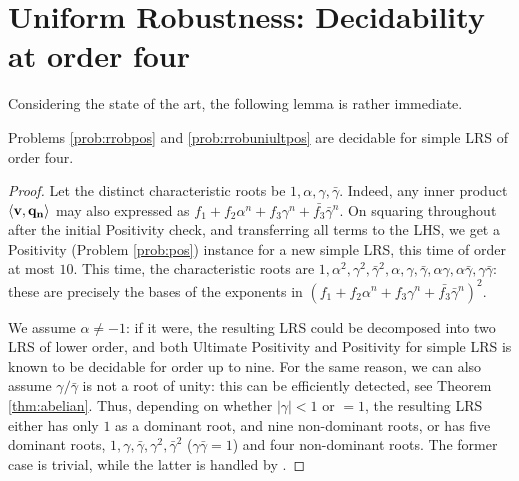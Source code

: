 \section{Uniform Robustness: Decidability at order four}
\label{section:decidability}

  \label{thm:abelian}

 Considering the state of the art, the following lemma is rather immediate. 
\begin{lemma}
Problems \ref{prob:rrobpos} and \ref{prob:rrobuniultpos} are decidable for simple LRS of order four.
\end{lemma}
\begin{proof}
Let the distinct characteristic roots be $1, \alpha, \gamma, \bar{\gamma}$. Indeed, any inner product $\langle\mathbf{v}, \mathbf{q_n}\rangle$ may also expressed as $f_1 + f_2\alpha^n + f_3 \gamma^n + \bar{f_3}\bar{\gamma}^n$. On squaring throughout after the initial Positivity check, and transferring all terms to the LHS, we get a Positivity (Problem \ref{prob:pos}) instance for a new simple LRS, this time of order at most $10$. This time, the characteristic roots are $1, \alpha^2, \gamma^2, \bar{\gamma}^2, \alpha, \gamma, \bar{\gamma}, \alpha\gamma, \alpha\bar{\gamma}, \gamma\bar{\gamma}$: these are precisely the bases of the exponents in $(f_1 + f_2\alpha^n + f_3 \gamma^n + \bar{f_3}\bar{\gamma}^n)^2$.

We assume $\alpha \ne -1$: if it were, the resulting LRS could be decomposed into two LRS of lower order, and both Ultimate Positivity \cite{ouaknine2014ultimate} and Positivity  \cite{ouaknine2014positivity} for simple LRS is known to be decidable for order up to nine. For the same reason, we can also assume $\gamma/\bar{\gamma}$ is not a root of unity: this can be efficiently detected, see Theorem \ref{thm:abelian}. Thus, depending on whether $|\gamma| < 1$ or $= 1$, the resulting LRS either has only $1$ as a dominant root, and nine non-dominant roots, or has five dominant roots, $1, \gamma, \bar{\gamma}, \gamma^2, \bar{\gamma}^2$ ($\gamma\bar{\gamma} = 1$) and four non-dominant roots. The former case is trivial, while the latter is handled by \cite{ouaknine2014positivity}.
\end{proof}

